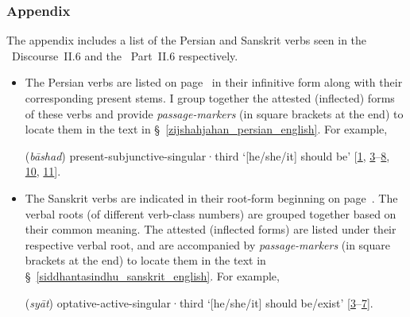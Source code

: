 \subsubsection*{Appendix}\label{format_appendix}
The appendix includes a list of the Persian and Sanskrit verbs seen in the \ZijiShahJahani\ Discourse~II.6 and the \Siddhantasindhu\ Part~II.6 respectively. 
\begin{itemize}[topsep=0pt]
\item The Persian verbs are listed on page~\pageref{persian_verbs} in their infinitive form along with their corresponding present stems. I group together the attested (inflected) forms of these verbs and provide \textit{passage-markers} (in square brackets at the end) to locate them in the text in \S~\ref{zijshahjahan_persian_english}. For example,
{\par\centering{} (\textit{bāshad})  \acrshort{present}-\acrshort{subjunctive}-\acrshort{singular}·\acrshort{third} `[he/she/it] should be' [\hyperlink{Ppass1}{1}, \hyperlink{Ppass3}{3}--\hyperlink{Ppass8}{8}, \hyperlink{Ppass10}{10}, \hyperlink{Ppass11}{11}].\par}
\item The Sanskrit verbs are indicated in their root-form beginning on page~\pageref{sanskrit_verbs}. The verbal roots (of different verb-class numbers) are grouped together based on their common meaning. The attested (inflected forms) are listed under their respective verbal root, and are accompanied by \textit{passage-markers} (in square brackets at the end) to locate them in the text in \S~\ref{siddhantasindhu_sanskrit_english}. For example,
{\par\centering
{} (\textit{syāt}) \acrshort{optative}-\acrshort{active}-\acrshort{singular}·\acrshort{third} `[he/she/it] should be/exist' [\hyperlink{Spass3}{3}--\hyperlink{Spass7}{7}].
\par}
\end{itemize}

